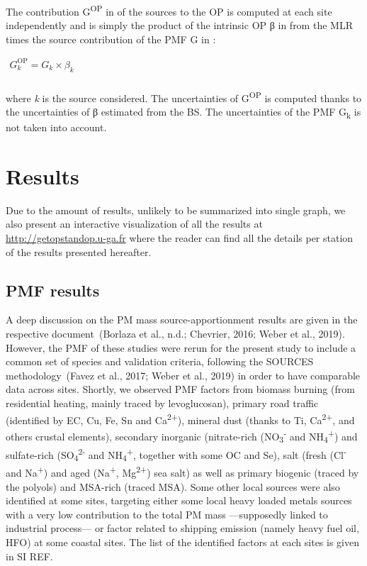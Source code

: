\documentclass[
]{article}
\begin{document}
The contribution G\textsuperscript{OP} in of the sources to the OP is
computed at each site independently and is simply the product of the
intrinsic OP β in from the MLR times the source contribution of the PMF
G in :

\(\begin{matrix}
G_{k}^{\text{OP}} = G_{k} \times \beta_{k} \\
\end{matrix}\)

where \emph{k} is the source considered. The uncertainties of
G\textsuperscript{OP} is computed thanks to the uncertainties of β
estimated from the BS. The uncertainties of the PMF G\textsubscript{k}
is not taken into account.

\hypertarget{results}{%
\section{Results}\label{results}}

Due to the amount of results, unlikely to be summarized into single
graph, we also present an interactive visualization of all the results
at \href{http://getopstandop.u-ga.fr/}{http://getopstandop.u-ga.fr}
where the reader can find all the details per station of the results
presented hereafter.

\hypertarget{pmf-results}{%
\subsection{PMF results}\label{pmf-results}}

A deep discussion on the PM mass source-apportionment results are given
in the respective document~(Borlaza et al., n.d.; Chevrier, 2016; Weber
et al., 2019). However, the PMF of these studies were rerun for the
present study to include a common set of species and validation
criteria, following the SOURCES methodology~(Favez et al., 2017; Weber
et al., 2019) in order to have comparable data across sites. Shortly, we
observed PMF factors from biomass burning (from residential heating,
mainly traced by levoglucosan), primary road traffic (identified by EC,
Cu, Fe, Sn and Ca\textsuperscript{2+}), mineral dust (thanks to Ti,
Ca\textsuperscript{2+}, and others crustal elements), secondary
inorganic (nitrate-rich (NO\textsubscript{3}\textsuperscript{-} and
NH\textsubscript{4}\textsuperscript{+}) and sulfate-rich
(SO\textsubscript{4}\textsuperscript{2-} and
NH\textsubscript{4}\textsuperscript{+}, together with some OC and Se),
salt (fresh (Cl\textsuperscript{-} and Na\textsuperscript{+}) and aged
(Na\textsuperscript{+}, Mg\textsuperscript{2+}) sea salt) as well as
primary biogenic (traced by the polyols) and MSA-rich (traced MSA). Some
other local sources were also identified at some sites, targeting either
some local heavy loaded metals sources with a very low contribution to
the total PM mass ---supposedly linked to industrial process--- or
factor related to shipping emission (namely heavy fuel oil, HFO) at some
coastal sites. The list of the identified factors at each sites is given
in SI REF.
\end{document}
